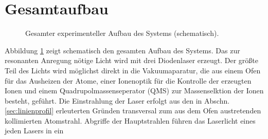 \section{Gesamtaufbau}\label{sec:gesamtaufbau}
\begin{figure}[h]
 	\centering
	\caption[Gesamter experimenteller Aufbau, schematisch]{Gesamter experimenteller
	Aufbau des Systems (schematisch).}\label{fig:experimenteller_aufbau_gesamt}
\end{figure}
Abbildung \ref{fig:experimenteller_aufbau_gesamt} zeigt schematisch den gesamten
Aufbau des Systems. Das zur resonanten Anregung nötige Licht wird mit drei
Diodenlaser erzeugt. Der größte Teil des Lichts wird möglichst
direkt in die Vakuumaparatur, die aus einem Ofen für das Ausheizen der Atome,
einer Ionenoptik für die Kontrolle der erzeugten Ionen und einem
Quadrupolmassenseperator (QMS) zur Massenselktion der Ionen besteht, geführt.
Die Einstrahlung der Laser erfolgt aus den in Abschn. \ref{sec:linienprofil}
erleuterten Gründen transversal zum aus dem Ofen austretenden kollimierten Atomstrahl.
Abgriffe der Hauptstrahlen führen das Laserlicht eines jeden Lasers in ein
